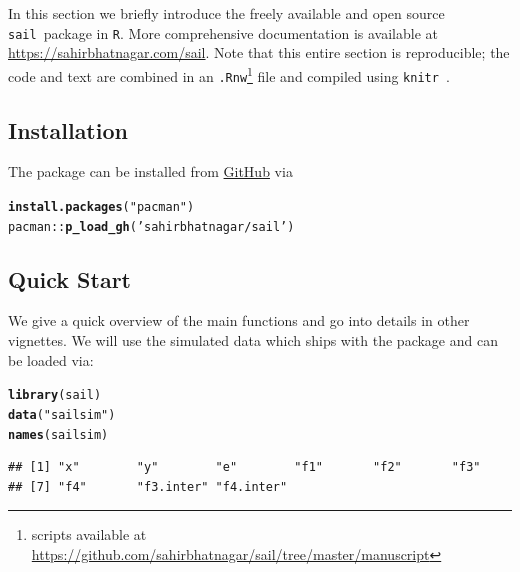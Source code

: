 \documentclass[12pt,letter]{article}\usepackage[]{graphicx}\usepackage[]{color}
\makeatletter
\newcommand{\hlstr}[1]{\textcolor[rgb]{0.192,0.494,0.8}{#1}}%
\newcommand{\hlopt}[1]{\textcolor[rgb]{0,0,0}{#1}}%
\newcommand{\hlstd}[1]{\textcolor[rgb]{0.345,0.345,0.345}{#1}}%
\newcommand{\hlkwd}[1]{\textcolor[rgb]{0.737,0.353,0.396}{\textbf{#1}}}%
\newenvironment{kframe}{%
 \def\at@end@of@kframe{}%
 \ifinner\ifhmode%
  \def\at@end@of@kframe{\end{minipage}}%
  \begin{minipage}{\columnwidth}%
 \fi\fi%
 \def\FrameCommand##1{\hskip\@totalleftmargin \hskip-\fboxsep
 \colorbox{shadecolor}{##1}\hskip-\fboxsep
     \hskip-\linewidth \hskip-\@totalleftmargin \hskip\columnwidth}%
 \MakeFramed {\advance\hsize-\width
   \@totalleftmargin\z@ \linewidth\hsize
   \@setminipage}}%
 {\par\unskip\endMakeFramed%
 \at@end@of@kframe}
\newenvironment{knitrout}{}{} %
\newcommand{\sail}{\texttt{sail}}
\makeatother
\begin{document}
In this section we briefly introduce the freely available and open source \sail ~package in \texttt{R}. More comprehensive documentation is available at \url{https://sahirbhatnagar.com/sail}. Note that this entire section is reproducible; the code and text are combined in an \texttt{.Rnw}\footnote[1]{scripts available at \url{https://github.com/sahirbhatnagar/sail/tree/master/manuscript}} file and compiled using \texttt{knitr}~\citep{xie2015dynamic}. 

\subsection{Installation}

The package can be installed from \href{https://github.com/sahirbhatnagar/sail}{GitHub} via


\begin{knitrout}\scriptsize
{}\color{fgcolor}\begin{kframe}
\begin{alltt}
\hlkwd{install.packages}\hlstd{(}\hlstr{"pacman"}\hlstd{)}
\hlstd{pacman}\hlopt{::}\hlkwd{p_load_gh}\hlstd{(}\hlstr{'sahirbhatnagar/sail'}\hlstd{)}
\end{alltt}
\end{kframe}
\end{knitrout}



\subsection{Quick Start}

We give a quick overview of the main functions and go into details in other vignettes. We will use the simulated data which ships with the package and can be loaded via:

\begin{knitrout}\scriptsize
{}\color{fgcolor}\begin{kframe}
\begin{alltt}
\hlkwd{library}\hlstd{(sail)}
\hlkwd{data}\hlstd{(}\hlstr{"sailsim"}\hlstd{)}
\hlkwd{names}\hlstd{(sailsim)}
\end{alltt}
\begin{verbatim}
## [1] "x"        "y"        "e"        "f1"       "f2"       "f3"      
## [7] "f4"       "f3.inter" "f4.inter"
\end{verbatim}
\end{kframe}
\end{knitrout}
\end{document}
